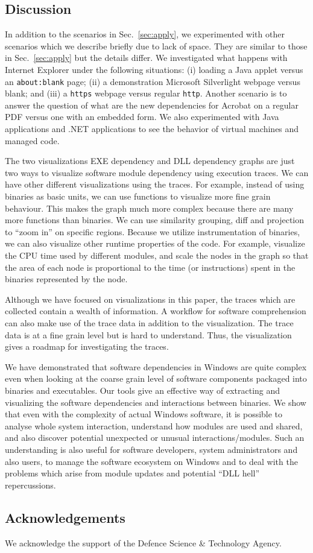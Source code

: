 \subsection{Discussion}

In addition to the scenarios in Sec.~\ref{sec:apply},
we experimented with other scenarios which we describe briefly due to lack
of space. They are similar to those in Sec.~\ref{sec:apply} but the details differ.
We investigated what happens with Internet Explorer under
the following situations:
(i) loading a Java applet versus an {\tt about:blank} page;
(ii) a demonstration Microsoft Silverlight webpage versus blank; and
(iii) a {\tt https} webpage versus regular {\tt http}.
Another scenario is to answer the question of
what are the new dependencies for Acrobat on a regular PDF versus
one with an embedded form.
We also experimented with Java applications and .NET applications
to see the behavior of virtual machines and managed code.

The two visualizations EXE dependency and DLL dependency graphs are just two
ways to visualize software module dependency using execution traces.
We can have other different visualizations using the traces.
For example, instead of using binaries as basic units, we can use functions
to visualize more fine grain behaviour.
This makes the graph much more complex because there are many more functions
than binaries.
We can use similarity grouping, diff and projection to ``zoom in''
on specific regions.
Because we utilize instrumentation of binaries, we can also visualize other runtime
properties of the code.
For example, visualize the CPU time used by different modules,
and scale the nodes in the graph so that the area of each node is proportional to the time
(or instructions) spent in the binaries represented by the node.

Although we have focused on visualizations in this paper, the traces which are collected
contain a wealth of information. A workflow for software comprehension can also make use
of the trace data in addition to the visualization.
The trace data is at a fine grain level but is hard to understand.
Thus, the visualization gives a roadmap for investigating the traces.

We have demonstrated that software dependencies in Windows are quite
complex even when looking at the coarse grain level of software components
packaged into binaries and executables.
Our tools give an effective way of extracting and
visualizing the software dependencies and interactions between binaries.
We show that even with the complexity of actual Windows software,
it is possible to analyse whole system interaction,
understand how modules are used and shared,
and also discover potential unexpected or unusual interactions/modules.
Such an understanding is also useful for software developers,
system administrators and also users, to manage the
software ecosystem on Windows and to deal with the problems which arise
from module updates and potential ``DLL hell'' repercussions.

\subsection{Acknowledgements}

We acknowledge the support of the Defence Science \& Technology Agency.


